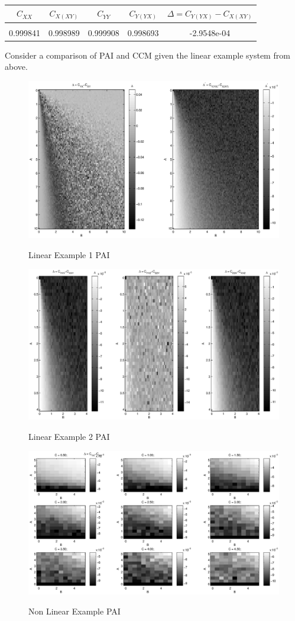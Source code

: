 \documentclass{article}
\begin{document}
\begin{tabular}{c|c|c|c|c}
$C_{XX}$ & $C_{X(XY)}$ & $C_{YY}$ & $C_{Y(YX)}$ & $\Delta=C_{Y(YX)}-C_{X(XY)}$ \\
\hline \\
0.999841 & 0.998989 & 0.999908 & 0.998693 & -2.9548e-04
\end{tabular}

Consider a comparison of PAI and CCM given the linear example system from above.  
\begin{figure}[H]
\includegraphics[scale=0.6]{LinearEx_PAI.eps} \\
\caption{Linear Example 1 PAI}
\label{fig1}
\end{figure}

\begin{figure}[H]
\includegraphics[scale=0.6]{LinearXYZPAIEx.eps} \\
\caption{Linear Example 2 PAI}
\label{fig2}
\end{figure}

\begin{figure}[H]
\includegraphics[scale=0.6]{NonLinearPAIEx.eps} \\
\caption{Non Linear Example PAI}
\label{fig2}
\end{figure}
\end{document}
